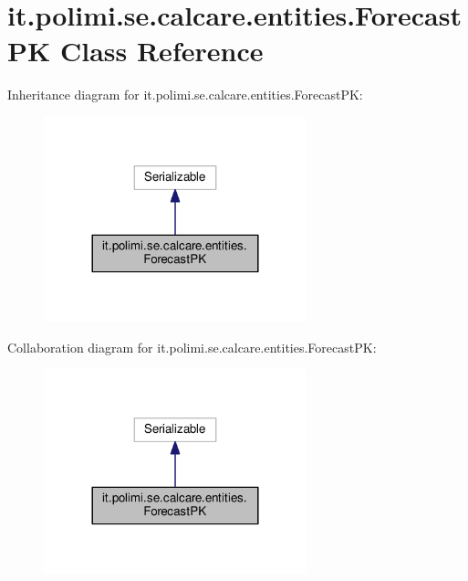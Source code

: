 \hypertarget{classit_1_1polimi_1_1se_1_1calcare_1_1entities_1_1ForecastPK}{}\section{it.\+polimi.\+se.\+calcare.\+entities.\+Forecast\+P\+K Class Reference}
\label{classit_1_1polimi_1_1se_1_1calcare_1_1entities_1_1ForecastPK}


Inheritance diagram for it.\+polimi.\+se.\+calcare.\+entities.\+Forecast\+P\+K\+:
\nopagebreak
\begin{figure}[H]
\begin{center}
\leavevmode
\includegraphics[width=216pt]{classit_1_1polimi_1_1se_1_1calcare_1_1entities_1_1ForecastPK__inherit__graph}
\end{center}
\end{figure}


Collaboration diagram for it.\+polimi.\+se.\+calcare.\+entities.\+Forecast\+P\+K\+:
\nopagebreak
\begin{figure}[H]
\begin{center}
\leavevmode
\includegraphics[width=216pt]{classit_1_1polimi_1_1se_1_1calcare_1_1entities_1_1ForecastPK__coll__graph}
\end{center}
\end{figure}
